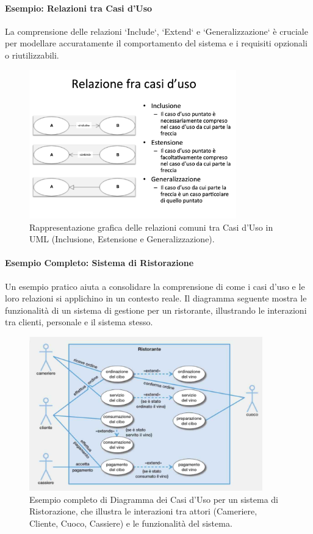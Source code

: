\paragraph{Esempio: Relazioni tra Casi d'Uso}
La comprensione delle relazioni `Include`, `Extend` e `Generalizzazione` è cruciale per modellare accuratamente il comportamento del sistema e i requisiti opzionali o riutilizzabili.
\begin{figure}[h!]
    \centering
    \includegraphics[width=0.8\textwidth]{immagini/uml_use_case_relazioni.png} %
    \caption{Rappresentazione grafica delle relazioni comuni tra Casi d'Uso in UML (Inclusione, Estensione e Generalizzazione).}
    \label{fig:uml_use_case_relazioni}
\end{figure}

\paragraph{Esempio Completo: Sistema di Ristorazione}
Un esempio pratico aiuta a consolidare la comprensione di come i casi d'uso e le loro relazioni si applichino in un contesto reale. Il diagramma seguente mostra le funzionalità di un sistema di gestione per un ristorante, illustrando le interazioni tra clienti, personale e il sistema stesso.
\begin{figure}[h!]
    \centering
    \includegraphics[width=0.9\textwidth]{immagini/diagramma_casi_uso_ristorante.jpg} %
    \caption{Esempio completo di Diagramma dei Casi d'Uso per un sistema di Ristorazione, che illustra le interazioni tra attori (Cameriere, Cliente, Cuoco, Cassiere) e le funzionalità del sistema.}
    \label{fig:diagramma_casi_uso_ristorante_completo}
\end{figure}

